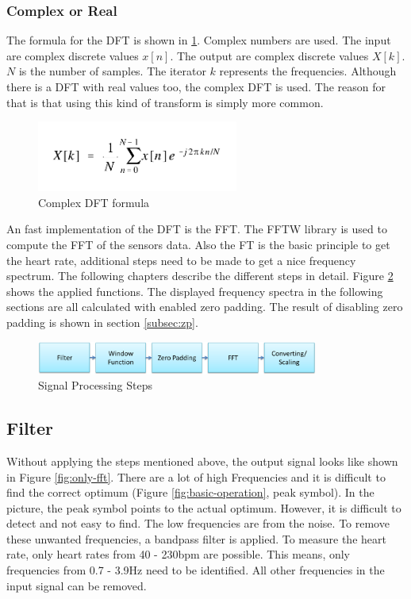 \documentclass[notitlepage]{scrreprt}
\begin{document}
\subsubsection{Complex or Real}
The formula for the DFT is shown in \ref{fig:dft-formula}. Complex numbers are used. The input are complex discrete values $x[n]$. The output are complex discrete values $X[k]$. $N$ is the number of samples. The iterator $k$ represents the frequencies. Although there is a DFT with real values too, the complex DFT is used. The reason for that is that using this kind of transform is simply more common.

\begin{figure}[H]
	\centering
	\includegraphics[width=250px]{images/complex_dft_formula.png}
	\caption{Complex DFT formula}
	\label{fig:dft-formula}
\end{figure}

An fast implementation of the DFT is the FFT. The FFTW library is used to compute the FFT of the sensors data. Also the FT is the basic principle to get the heart rate, additional steps need to be made to get a nice frequency spectrum. The following chapters describe the different steps in detail. Figure \ref{fig:signal-processing-steps1} shows the applied functions. The displayed frequency spectra in the following sections are all calculated with enabled zero padding. The result of disabling zero padding is shown in section \ref{subsec:zp}.

\begin{figure}[H]
	\centering
	\includegraphics[width=350px]{images/signal_processing_steps1.png}
	\caption{Signal Processing Steps}
	\label{fig:signal-processing-steps1}
\end{figure}

\subsection{Filter}
Without applying the steps mentioned above, the output signal looks like shown in Figure \ref{fig:only-fft}. There are a lot of high Frequencies and it is difficult to find the correct optimum (Figure \ref{fig:basic-operation}, peak symbol). In the picture, the peak symbol points to the actual optimum. However, it is difficult to detect and not easy to find. The low frequencies are from the noise. To remove these unwanted frequencies, a bandpass filter is applied. To measure the heart rate, only heart rates from 40 - 230bpm are possible. This means, only frequencies from 0.7 - 3.9Hz need to be identified. All other frequencies in the input signal can be removed.
\end{document}
